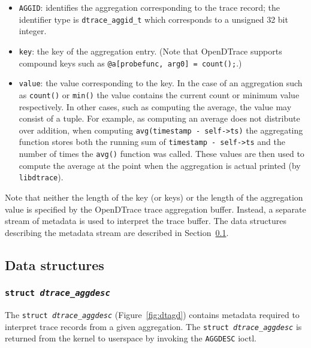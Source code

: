 \begin{itemize}

	\item{\texttt{AGGID}}: identifies the aggregation corresponding to the
trace record; the identifier type is \texttt{dtrace\_aggid\_t} which corresponds
to a unsigned 32 bit integer.

	\item{\texttt{key}:} the key of the aggregation entry. (Note that
OpenDTrace supports compound keys such as \texttt{@a[probefunc, arg0] = count();}.)

	\item{\texttt{value}:} the value corresponding to the key. In the case of
an aggregation such as \texttt{count()} or \texttt{min()} the value contains
the current count or minimum value respectively. In other cases, such as
computing the average, the value may consist of a tuple. For example, as
computing an average does not distribute over addition, when computing
\texttt{avg(timestamp - self->ts)} the aggregating function stores both the
running sum of \texttt{timestamp - self->ts} and the number of times the
\texttt{avg()} function was called. These values are then used to compute the
average at the point when the aggregation is actual printed (by \texttt{libdtrace}).

\end{itemize}

Note that neither the length of the key (or keys) or the length of the aggregation 
value is specified by the OpenDTrace trace aggregation buffer.
Instead, a separate stream of metadata is used to interpret the trace buffer.
The data structures describing the metadata stream are described in
Section~\ref{subsec:agg_data_structures}.

\subsection{Data structures}
\label{subsec:agg_data_structures}

\subsubsection{\texttt{struct~\textit{dtrace\_aggdesc}}}
\label{subsubsec:dtagd-aggdesc}

The \texttt{struct~\textit{dtrace\_aggdesc}} (Figure~\ref{fig:dtagd})
contains metadata required to interpret trace records from a given
aggregation.  The \texttt{struct~\textit{dtrace\_aggdesc}} is returned
from the kernel to userspace by invoking the \texttt{AGGDESC} ioctl.

